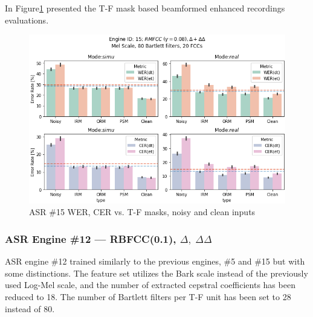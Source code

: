 In Figure\;\ref{fig:asr15_wer_masks} presented the T-F mask based
beamformed enhanced recordings evaluations.
\begin{figure}[H]
    \centering
    \includegraphics[width=0.95\linewidth]{ASR/images/asr15_wer_masks.png}
    \caption{ASR \#15 WER, CER vs. T-F masks, noisy and clean inputs }\label{fig:asr15_wer_masks}
\end{figure}

\subsubsection{ASR Engine \#12 --- RBFCC(0.1), \(\Delta,\;\Delta\Delta\)}
ASR engine \#12 trained similarly to the previous
engines, \#5 and \#15 but with some distinctions.
The feature set utilizes the Bark scale instead of the previously
used Log-Mel scale, and the number of extracted cepstral 
coefficients has been reduced to 18. 
The number of Bartlett filters per T-F unit has been set
to 28 instead of 80.

\bigskip

